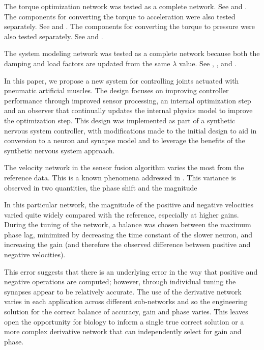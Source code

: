 
The torque optimization network was tested as a complete network. See
 and .
The components for converting the torque to
acceleration were also tested
separately. See  and .
The components for converting the torque to pressure were also tested
separately. See  and .


The system modeling network was tested as a complete network because both the
damping and load factors are updated from the same $\lambda$ value. See 
, ,
 and .

\label{chap:discussion}

In this paper, we propose a new system for controlling joints actuated with
pneumatic artificial muscles. The design focuses on improving controller
performance through improved sensor processing, an internal optimization step
and an observer that continually updates the internal physics model to improve
the optimization step. This design was implemented as part of a synthetic
nervous system controller, with modifications made to the initial design to aid
in conversion to a neuron and synapse model and to leverage the benefits of the
synthetic nervous system approach.


The velocity network in the sensor fusion algorithm varies the most from the
reference data. This is a known phenomena addressed in
\cite{NickFunctionalSubnetwork}. This variance is observed in two quantities,
the phase shift and the magnitude

In this particular network, the magnitude of the positive and negative
velocities varied quite widely compared with the reference, especially at
higher gains. During the tuning of the network, a balance was chosen between
the maximum phase lag, minimized by decreasing the time constant of the slower
neuron, and increasing the gain (and therefore the observed difference between
positive and negative velocities).

This error suggests that there is an underlying error in the way that positive
and negative operations are computed; however, through individual tuning the
synapses appear to be relatively accurate. The use of the derivative network
varies in each application across different sub-networks and so the engineering
solution for the correct balance of accuracy, gain and phase varies. This
leaves open the opportunity for biology to inform a single true correct
solution or a more complex derivative network that can independently select for
gain and phase.

